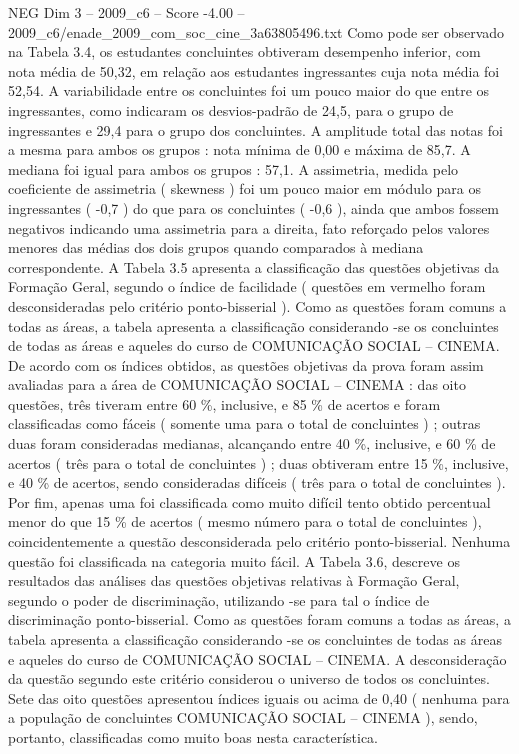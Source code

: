\begin{textsample}{NEG Dim 3 – 2009\_c6 – Score -4.00 – 2009\_c6/enade\_2009\_com\_soc\_cine\_3a63805496.txt}
Como pode ser observado na Tabela 3.4, os estudantes concluintes obtiveram desempenho inferior, com nota média de 50,32, em relação aos estudantes ingressantes cuja nota média foi 52,54.
A variabilidade entre os concluintes foi um pouco maior do que entre os ingressantes, como indicaram os desvios-padrão de 24,5, para o grupo de ingressantes e 29,4 para o grupo dos concluintes.
A amplitude total das notas foi a mesma para ambos os grupos : nota mínima de 0,00 e máxima de 85,7.
A mediana foi igual para ambos os grupos : 57,1.
A assimetria, medida pelo coeficiente de assimetria ( skewness ) foi um pouco maior em módulo para os ingressantes ( -0,7 ) do que para os concluintes ( -0,6 ), ainda que ambos fossem negativos indicando uma assimetria para a direita, fato reforçado pelos valores menores das médias dos dois grupos quando comparados à mediana correspondente.
A Tabela 3.5 apresenta a classificação das questões objetivas da Formação Geral, segundo o índice de facilidade ( questões em vermelho foram desconsideradas pelo critério ponto-bisserial ).
Como as questões foram comuns a todas as áreas, a tabela apresenta a classificação considerando -se os concluintes de todas as áreas e aqueles do curso de COMUNICAÇÃO SOCIAL – CINEMA.
De acordo com os índices obtidos, as questões objetivas da prova foram assim avaliadas para a área de COMUNICAÇÃO SOCIAL – CINEMA : das oito questões, três tiveram entre 60 \%, inclusive, e 85 \% de acertos e foram classificadas como fáceis ( somente uma para o total de concluintes ) ; outras duas foram consideradas medianas, alcançando entre 40 \%, inclusive, e 60 \% de acertos ( três para o total de concluintes ) ; duas obtiveram entre 15 \%, inclusive, e 40 \% de acertos, sendo consideradas difíceis ( três para o total de concluintes ).
Por fim, apenas uma foi classificada como muito difícil tento obtido percentual menor do que 15 \% de acertos ( mesmo número para o total de concluintes ), coincidentemente a questão desconsiderada pelo critério ponto-bisserial.
Nenhuma questão foi classificada na categoria muito fácil.
A Tabela 3.6, descreve os resultados das análises das questões objetivas relativas à Formação Geral, segundo o poder de discriminação, utilizando -se para tal o índice de discriminação ponto-bisserial.
Como as questões foram comuns a todas as áreas, a tabela apresenta a classificação considerando -se os concluintes de todas as áreas e aqueles do curso de COMUNICAÇÃO SOCIAL – CINEMA.
A desconsideração da questão segundo este critério considerou o universo de todos os concluintes.
Sete das oito questões apresentou índices iguais ou acima de 0,40 ( nenhuma para a população de concluintes COMUNICAÇÃO SOCIAL – CINEMA ), sendo, portanto, classificadas como muito boas nesta característica.

\end{textsample}
